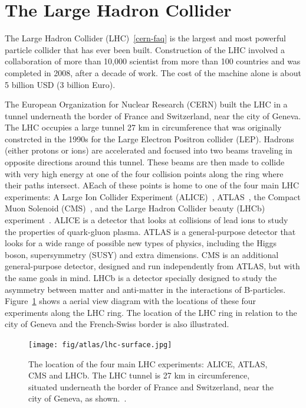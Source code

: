 \section{The Large Hadron Collider}
The Large Hadron Collider (LHC)~\ref{cern-faq} is the largest and most powerful particle collider that has ever been built. Construction of the LHC involved a collaboration of more than 10,000 scientist from more than 100 countries and was completed in 2008, after a decade of work. The cost of the machine alone is about 5 billion USD (3 billion Euro).

The European Organization for Nuclear Research (CERN) built the LHC in a tunnel underneath the border of France and Switzerland, near the city of Geneva. The LHC occupies a large tunnel 27 km in circumference that was originally constrcted in the 1990s for the Large Electron Positron collider (LEP). Hadrons (either protons or ions) are accelerated and focused into two beams traveling in opposite directions around this tunnel. These beams are then made to collide with very high energy at one of the four collision points along the ring where their paths intersect. AEach of these points is home to one of the four main LHC experiments: A Large Ion Collider
Experiment (ALICE)~\cite{cern-jinst-alice}, ATLAS~\cite{cern-jinst-atlas}, the Compact Muon Solenoid (CMS)~\cite{cern-jinst-cms}, and the Large Hadron Collider beauty (LHCb) experiment~\cite{cern-jinst-lhcb}. ALICE is a detector that looks at collisions of lead ions to study the properties of quark-gluon plasma. ATLAS is a general-purpose detector that looks for a wide range of possible new types of physics, including the Higgs boson, supersymmetry (SUSY) and extra dimensions. CMS is an additional general-purpose detector, designed and run independently from ATLAS, but with the same goals in mind. LHCb is a detector specially designed to study the asymmetry between matter and anti-matter in the interactions of B-particles. Figure~\ref{fig:lhc-exp} shows a aerial view diagram with the locations of these four experiments along the LHC ring. The location of the LHC ring in relation to the city of Geneva and the French-Swiss border is also illustrated.

\begin{figure}[tp]
  \centering
  \texttt{[image: fig/atlas/lhc-surface.jpg]}
  \caption{The location of the four main LHC experiments: ALICE, ATLAS, CMS and LHCb. The LHC tunnel is 27 km in circumference, situated underneath the border of France and Switzerland, near the city of Geneva, as shown.~\cite{atlas-surface}.}
  \label{fig:lhc-exp}
\end{figure}


